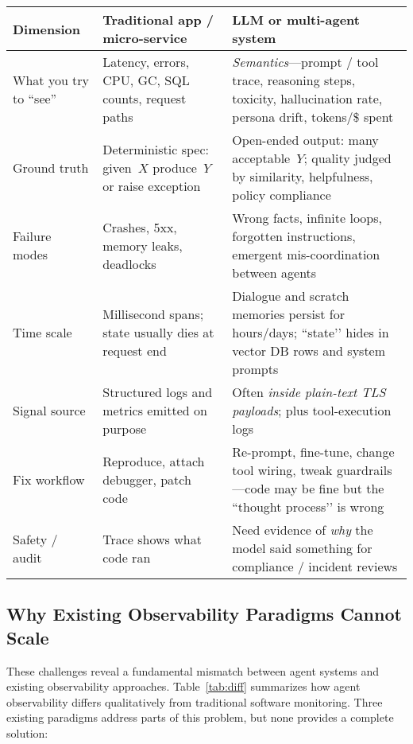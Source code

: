 \documentclass[sigplan,screen,9pt]{acmart}
\begin{document}
\begin{table*}[t]
  \caption{How AI agent observability differs from classic software observability}
  \label{tab:diff}
  \begin{tabularx}{\linewidth}{@{}>{\raggedright\arraybackslash}p{2.85cm}X X@{}}
    \toprule
    \textbf{Dimension} &
    \textbf{Traditional app / micro-service} &
    \textbf{LLM or multi-agent system} \\
    \midrule
    What you try to “see” &
    Latency, errors, CPU, GC, SQL counts, request paths &
    \emph{Semantics}—prompt / tool trace, reasoning steps, toxicity, hallucination rate, persona drift, tokens/\$ spent \\
    Ground truth &
    Deterministic spec: given~$X$ produce~$Y$ or raise exception &
    Open-ended output: many acceptable~$Y$; quality judged by similarity, helpfulness, policy compliance \\
    Failure modes &
    Crashes, 5xx, memory leaks, deadlocks &
    Wrong facts, infinite loops, forgotten instructions, emergent mis-coordination between agents \\
    Time scale &
    Millisecond spans; state usually dies at request end &
    Dialogue and scratch memories persist for hours/days; “state’’ hides in vector DB rows and system prompts \\
    Signal source &
    Structured logs and metrics emitted on purpose &
    Often \emph{inside plain-text TLS payloads}; plus tool-execution logs \\
    Fix workflow &
    Reproduce, attach debugger, patch code &
    Re-prompt, fine-tune, change tool wiring, tweak guardrails—code may be fine but the “thought process’’ is wrong \\
    Safety / audit &
    Trace shows what code ran &
    Need evidence of \emph{why} the model said something for compliance / incident reviews \\
    \bottomrule
  \end{tabularx}
\end{table*}

\subsection{Why Existing Observability Paradigms Cannot Scale}

These challenges reveal a fundamental mismatch between agent systems and existing observability approaches. Table~\ref{tab:diff} summarizes how agent observability differs qualitatively from traditional software monitoring. Three existing paradigms address parts of this problem, but none provides a complete solution:
\end{document}
